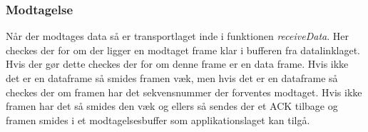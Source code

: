 \subsubsection{Modtagelse}
Når der modtages data så er transportlaget inde i funktionen \textit{receiveData}. Her checkes der for om der ligger en modtaget frame klar i bufferen fra datalinklaget. Hvis der gør dette checkes der for om denne frame er en data frame. Hvis ikke det er en dataframe så smides framen væk, men hvis det er en dataframe så checkes der om framen har det sekvensnummer der forventes modtaget. Hvis ikke framen har det så smides den væk og ellers så sendes der et ACK tilbage og framen smides i et modtagelsesbuffer som applikationslaget kan tilgå.